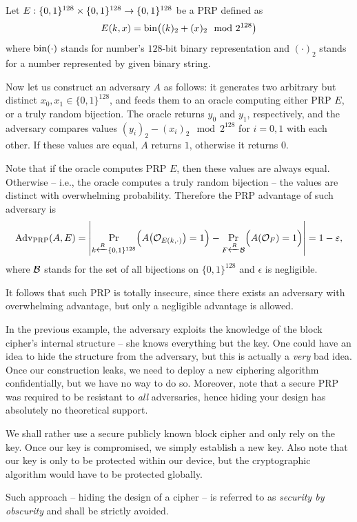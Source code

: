 \begin{example}
	Let $E:\{0,1\}^{128}\times\{0,1\}^{128}\rightarrow\{0,1\}^{128}$ be a PRP defined as
	\[
		E(k,x) = \operatorname*{bin}\bigl((k)_2 + (x)_2\mod{2^{128}}\bigr)
	\]
	where $\operatorname*{bin}(\cdot)$ stands for number's $128$-bit binary representation and $(\cdot)_2$ stands for a number represented by given binary string.
	
	Now let us construct an adversary $A$ as follows: it generates two arbitrary but distinct $x_0,x_1\in\{0,1\}^{128}$, and feeds them to an oracle computing either PRP $E$, or a truly random bijection. The oracle returns $y_0$ and $y_1$, respectively, and the adversary compares values $(y_i)_2 - (x_i)_2 \mod{2^{128}}$ for $i=0,1$ with each other. If these values are equal, $A$ returns $1$, otherwise it returns $0$.
	
	Note that if the oracle computes PRP $E$, then these values are always equal. Otherwise -- i.e., the oracle computes a truly random bijection -- the values are distinct with overwhelming probability. Therefore the PRP advantage of such adversary is
	\[
		\operatorname*{Adv_{PRP}}(A,E) = \left| \Pr\limits_{k\xleftarrow{R} \{0,1\}^{128}}\Bigl(A\bigl({\cal O}_{E(k,\cdot)}\bigr)=1\Bigr) - \Pr\limits_{F\xleftarrow{R} {\cal B}}\Bigl(A({\cal O}_F)=1\Bigr) \right| = 1 - \varepsilon ,
	\]
	where $\cal B$ stands for the set of all bijections on $\{0,1\}^{128}$ and $\epsilon$ is negligible.
	
	It follows that such PRP is totally insecure, since there exists an adversary with overwhelming advantage, but only a negligible advantage is allowed.
\end{example}

\begin{note}   %
\label{note:secbyobsc}
	In the previous example, the adversary exploits the knowledge of the block cipher's internal structure -- she knows everything but the key. One could have an idea to hide the structure from the adversary, but this is actually a {\em very} bad idea. Once our construction leaks, we need to deploy a new ciphering algorithm confidentially, but we have no way to do so. Moreover, note that a secure PRP was required to be resistant to {\em all} adversaries, hence hiding your design has absolutely no theoretical support.
	
	We shall rather use a secure publicly known block cipher and only rely on the key. Once our key is compromised, we simply establish a new key. Also note that our key is only to be protected within our device, but the cryptographic algorithm would have to be protected globally.
	
	Such approach -- hiding the design of a cipher -- is referred to as {\em security by obscurity} and shall be strictly avoided.
\end{note}

